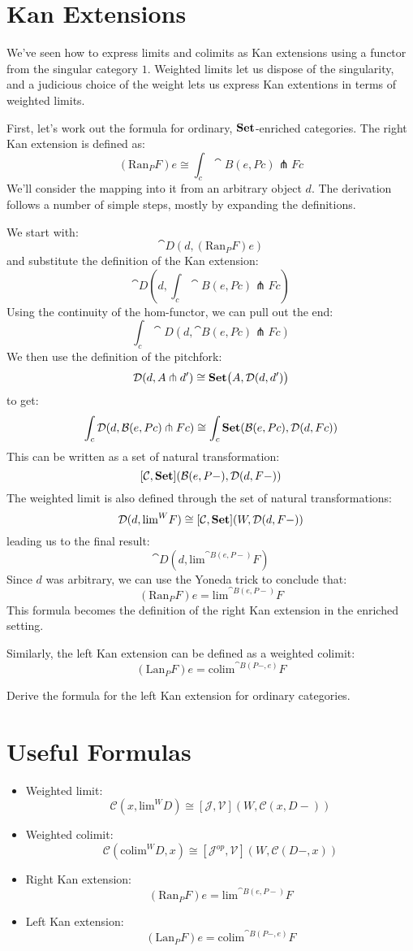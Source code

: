 \documentclass[DaoFP]{subfiles}
\begin{document}
\section{Kan Extensions}

We've seen how to express limits and colimits as Kan extensions using a functor from the singular category $1$. Weighted limits let us dispose of the singularity, and a judicious choice of the weight lets us express Kan extentions in terms of weighted limits. 

First, let's work out the formula for ordinary, $\mathbf{Set}$-enriched categories. The right Kan extension is defined as:
 \[ (\text{Ran}_P F) e \cong \int_c \cat B (e, P c) \pitchfork F c \]
 We'll consider the mapping into it from an arbitrary object $d$. The derivation follows a number of simple steps, mostly by expanding the definitions. 
 
 We start with:
\[ \cat D(d, (\text{Ran}_P F) e) \]
 and substitute the definition of the Kan extension:
 \[ \cat D(d, \int_c \cat B (e, P c) \pitchfork F c) \]
Using the continuity of the hom-functor, we can pull out the end:
 \[ \int_c \cat D(d,  \cat B (e, P c) \pitchfork F c) \]
We then use the definition of the pitchfork:
\[ \mathcal{D} (d, A \pitchfork d') \cong \mathbf{Set}  \big(A, \mathcal{D}(d, d')\big) \]
to get:
 \[ \int_c \mathcal{D}(d,  \mathcal{B} (e, P c) \pitchfork F c) \cong \int_c \mathbf{Set}( \mathcal{B}(e, P c), \mathcal{D}(d, F c))\]
This can be written as a set of natural transformation:
\[ [\mathcal{C}, \mathbf{Set}] (\mathcal{B}(e, P-), \mathcal{D}(d, F-)) \]
The weighted limit is also defined through the set of natural transformations:
\[  \mathcal D(d, \text{lim}^W F) \cong [\mathcal C, \mathbf{Set}] (W, \mathcal D(d, F-)) \]
leading us to the final result:
\[ \cat D(d, \text{lim}^{\cat B (e, P-)} F) \]
Since $d$ was arbitrary, we can use the Yoneda trick to conclude that:
\[ (\text{Ran}_P F) e = \text{lim}^{\cat B(e, P-)} F  \]
This formula becomes the definition of the right Kan extension in the enriched setting.

Similarly, the left Kan extension can be defined as a weighted colimit:
\[ (\text{Lan}_P F) e = \text{colim}^{\cat B(P-, e)} F \]

\begin{exercise}
Derive the formula for the left Kan extension for ordinary categories.
\end{exercise}

\section{Useful Formulas}
\begin{itemize}
\item Weighted limit:
\[  \mathcal C(x, \text{lim}^W D) \cong [\mathcal J, \mathcal V] (W, \mathcal C(x, D-)) \]
\item Weighted colimit:
\[  \mathcal C(\text{colim}^W D, x) \cong [\mathcal J^{op}, \mathcal V] (W, \mathcal C(D-, x)) \]
\item Right Kan extension:
\[ (\text{Ran}_P F) e = \text{lim}^{\cat B(e, P-)} F  \]
\item Left Kan extension:
\[ (\text{Lan}_P F) e = \text{colim}^{\cat B(P-, e)} F \]
\end{itemize}
\end{document}
